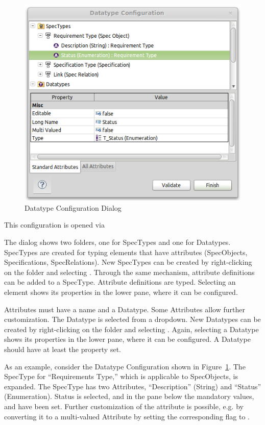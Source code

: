 \begin{figure}
\centering     
\includegraphics[width=0.8\linewidth]{../rmf-images/pror_datatype_configuration.png}
\caption{Datatype Configuration Dialog}      
\label{fig:DatatypeConfig}
\end{figure}

This configuration is opened via 

The dialog shows two folders, one for SpecTypes and one for Datatypes.
SpecTypes are created for typing elements that have attributes
(SpecObjects, Specifications, SpecRelations).  New SpecTypes can be
created by right-clicking on the folder and selecting .
Through the same mechanism, attribute definitions can be added to a
SpecType.  Attribute definitions are typed.  Selecting an element shows
its properties in the lower pane, where it can be configured.

Attributes must have a name and a Datatype.  Some Attributes
allow further customization.  The Datatype is selected from a
dropdown.  New Datatypes can be created by right-clicking on the folder
 and selecting .  Again, selecting a Datatype
shows its properties in the lower pane, where it can be configured.  A
Datatype should have at least the  property set.

As an example, consider the Datatype Configuration shown in Figure~\ref{fig:DatatypeConfig}.
The SpecType for ``Requirements Type,'' which is applicable to
SpecObjects, is expanded.  The SpecType has two Attributes,
``Description'' (String) and ``Status'' (Enumeration).  Status is
selected, and in the pane below the mandatory values,  and
 have been set.  Further customization of the attribute is
possible, e.g.  by converting it to a multi-valued Attribute by setting
the corresponding flag to .

